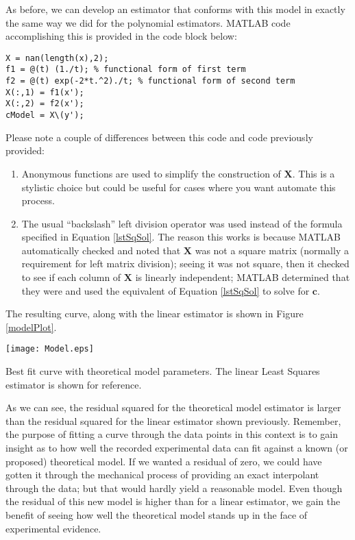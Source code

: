 As before, we can develop an estimator that conforms with this model in exactly the same way we did for the polynomial estimators.  MATLAB code accomplishing this is provided in the code block below:

\begin{lstlisting}[style=myMatlab]
X = nan(length(x),2);
f1 = @(t) (1./t); % functional form of first term
f2 = @(t) exp(-2*t.^2)./t; % functional form of second term
X(:,1) = f1(x');
X(:,2) = f2(x');
cModel = X\(y');
\end{lstlisting}

Please note a couple of differences between this code and code previously provided:

\begin{enumerate}%
\item Anonymous functions are used to simplify the construction of
  $\mathbf{X}$.  This is a stylistic choice but could be useful for
  cases where you want automate this process.
\item The usual ``backslash'' left division operator was used instead of the formula specified in Equation \ref{lstSqSol}.  The reason this works is because
  MATLAB automatically checked and noted that $\mathbf{X}$ was not a square
  matrix (normally a requirement for left matrix division); seeing it was
  not square, then it checked to see if each column of $\mathbf{X}$ is
  linearly independent; MATLAB determined that they were and used the equivalent of
  Equation \ref{lstSqSol} to solve for $\mathbf{c}$.  
\end{enumerate}

The resulting curve, along with the linear estimator is shown in Figure \ref{modelPlot}.


\begin{marginfigure}[-2.0cm]
\texttt{[image: Model.eps]}
\caption{Best fit curve with theoretical model parameters.  The linear Least
  Squares estimator is shown for reference.}
\label{modelPlot}
\end{marginfigure}  


As we can see, the residual squared for the theoretical model estimator is larger than the residual squared for the linear estimator shown previously. Remember, the purpose of fitting a curve through the data points in this context is to gain insight as to how well the recorded experimental data can fit against a known (or proposed) theoretical model.  If we wanted a residual of zero, we could have gotten it through the mechanical process of providing an exact interpolant through the data; but that would hardly yield a reasonable model.  Even though the residual of this new model is higher than for a linear estimator, we gain the benefit of seeing how well the theoretical model stands up in the face of experimental evidence.  

